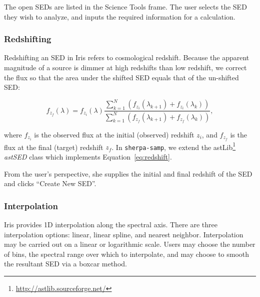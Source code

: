 \documentclass[final,5p]{elsarticle}
\begin{document}
The open SEDs are listed in the Science Tools frame. The user selects the SED they wish to analyze, and inputs the required information for a calculation.

\subsubsection{Redshifting}
Redshifting an SED in Iris refers to cosmological redshift. Because the apparent magnitude of a source is dimmer at high redshifts than low redshift, we correct the flux so that the area under the shifted SED equals that of the un-shifted SED:

\begin{equation} \label{eq:redshift}
f_{z_{f}}(\lambda) = f_{z_{i}}(\lambda) \frac{\sum_{k=1}^N (f_{z_{i}}(\lambda_{k+1})+f_{z_{i}}(\lambda_{k}))}{\sum_{k=1}^N (f_{z_{f}}(\lambda_{k+1})+f_{z_{f}}(\lambda_{k}))},
\end{equation}

where $f_{z_i}$ is the observed flux at the initial (observed) redshift $z_i$, and $f_{z_f}$ is the flux at the final (target) redshift $z_f$. In \verb|sherpa-samp|, we extend the astLib\footnote{\url{http://astlib.sourceforge.net/}} \textit{astSED} class which implements Equation~\ref{eq:redshift}.

From the user's perspective, she supplies the initial and final redshift of the SED and clicks ``Create New SED''.

\subsubsection{Interpolation}
Iris provides 1D interpolation along the spectral axis. There are three interpolation options: linear, linear spline, and nearest neighbor. Interpolation may be carried out on a linear or logarithmic scale. Users may choose the number of bins, the spectral range over which to interpolate, and may choose to smooth the resultant SED via a boxcar method.
\end{document}

